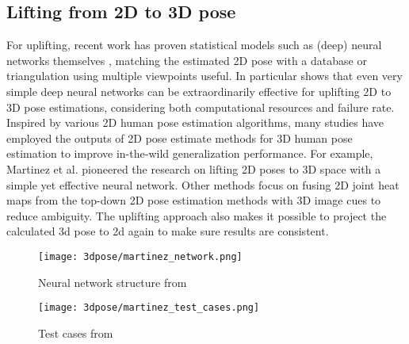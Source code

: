 \subsection{Lifting from 2D to 3D pose}
For uplifting, recent work has proven statistical models such as (deep) neural networks themselves \cite{Tome_2017_CVPR, Martinez_2017_ICCV}, matching the estimated 2D pose with a database \cite{Chen_2017_CVPR} or triangulation using multiple viewpoints \cite{Dong_2019_CVPR} useful. In particular \cite{Martinez_2017_ICCV} shows that even very simple deep neural networks can be extraordinarily effective for uplifting 2D to 3D pose estimations, considering both computational resources and failure rate.
\newline
Inspired by various 2D human pose estimation algorithms, many studies have employed the outputs of 2D pose estimate methods for 3D human pose estimation to improve in-the-wild generalization performance. For example, Martinez et al. \cite{Martinez_2017_ICCV} pioneered the research on lifting 2D poses to 3D space with a simple yet effective neural network. Other methods \cite{park_3d_2016, wang_deep_2021, zhou_hemlets_2019, habibie_wild_2019, tekin_learning_2017} focus on fusing 2D joint heat maps from the top-down 2D pose estimation methods with 3D image cues to reduce ambiguity. The uplifting approach also makes it possible to project the calculated 3d pose to 2d again to make sure results are consistent. \cite{wang_deep_2021} 

\begin{figure*}[!htb]
	\centering
	\texttt{[image: 3dpose/martinez\_network.png]}
	\caption{Neural network structure from \cite{Martinez_2017_ICCV}}
	\label{fig:martinez-network}
\end{figure*}

\begin{figure*}[!htb]
	\centering
	\texttt{[image: 3dpose/martinez\_test\_cases.png]}
	\caption{Test cases from \cite{Martinez_2017_ICCV}}
	\label{fig:martinez-test-cases}
\end{figure*}


